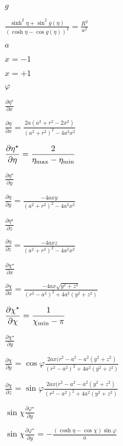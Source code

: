 \documentclass{article}
\begin{document}
$ g $
\pagebreak

$ \displaystyle\frac{\sinh ^2 \eta + \sin ^2 g(\eta)} {(\cosh \eta - \cos g(\eta))^2} = \displaystyle\frac{R^2}{a^2} $
\pagebreak

$ a $
\pagebreak

$ x=-1 $
\pagebreak

$ x=+1 $
\pagebreak

$ \varphi $
\pagebreak

$ \displaystyle\frac{\partial \eta^\star}{\partial x} $
\pagebreak

$ \displaystyle\frac{\partial \eta}{\partial x} = \displaystyle\frac{2 a (a^2 + r^2 - 2x^2)}{(a^2+r^2)^2 - 4a^2x^2} $
\pagebreak

$ \displaystyle\frac{\partial \eta^\star}{\partial \eta } = \displaystyle\frac{2}{\eta_{\rm max} - \eta_{\rm min}} $
\pagebreak

$ \displaystyle\frac{\partial \eta^\star}{\partial y} $
\pagebreak

$ \displaystyle\frac{\partial \eta}{\partial y} = \displaystyle\frac{-4axy}{(a^2+r^2)^2 - 4a^2x^2} $
\pagebreak

$ \displaystyle\frac{\partial \eta^\star}{\partial z} $
\pagebreak

$ \displaystyle\frac{\partial \eta}{\partial z} = \displaystyle\frac{-4axz}{(a^2+r^2)^2 - 4a^2x^2} $
\pagebreak

$ \displaystyle\frac{\partial \chi^\star}{\partial x} $
\pagebreak

$ \displaystyle\frac{\partial \chi}{\partial x} = \displaystyle\frac{-4ax\sqrt{y^2+z^2}}{(r^2-a^2)^2 + 4 a^2 (y^2+z^2)} $
\pagebreak

$ \displaystyle\frac{\partial \chi^\star}{\partial \chi } = \displaystyle\frac{1}{\chi_{\rm min} - \pi} $
\pagebreak

$ \displaystyle\frac{\partial \chi^\star}{\partial y} $
\pagebreak

$ \displaystyle\frac{\partial \chi}{\partial y} = \cos\varphi \displaystyle\frac{2ax(r^2-a^2-a^2(y^2+z^2)}{(r^2-a^2)^2 + 4 a^2 (y^2+z^2)} $
\pagebreak

$ \displaystyle\frac{\partial \chi}{\partial z} = \sin\varphi \displaystyle\frac{2ax(r^2-a^2-a^2(y^2+z^2)}{(r^2-a^2)^2 + 4 a^2 (y^2+z^2)} $
\pagebreak

$ \sin\chi \displaystyle\frac{\partial \varphi^\star}{\partial y} $
\pagebreak

$ \sin\chi \displaystyle\frac{\partial \varphi^\star}{\partial y} = - \displaystyle\frac{(\cosh\eta - \cos\chi) \sin\varphi}{a} $
\pagebreak
\end{document}
